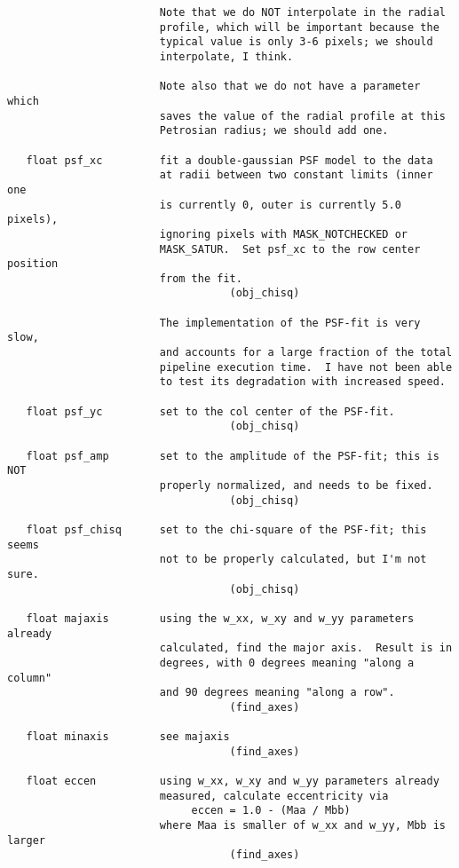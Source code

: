 \begin{verbatim}
                        Note that we do NOT interpolate in the radial
                        profile, which will be important because the
                        typical value is only 3-6 pixels; we should
                        interpolate, I think.

                        Note also that we do not have a parameter which
                        saves the value of the radial profile at this
                        Petrosian radius; we should add one.

   float psf_xc         fit a double-gaussian PSF model to the data
                        at radii between two constant limits (inner one
                        is currently 0, outer is currently 5.0 pixels),
                        ignoring pixels with MASK_NOTCHECKED or 
                        MASK_SATUR.  Set psf_xc to the row center position
                        from the fit.
                                   (obj_chisq)
 
                        The implementation of the PSF-fit is very slow,
                        and accounts for a large fraction of the total
                        pipeline execution time.  I have not been able
                        to test its degradation with increased speed.

   float psf_yc         set to the col center of the PSF-fit.
                                   (obj_chisq)

   float psf_amp        set to the amplitude of the PSF-fit; this is NOT
                        properly normalized, and needs to be fixed.
                                   (obj_chisq)

   float psf_chisq      set to the chi-square of the PSF-fit; this seems
                        not to be properly calculated, but I'm not sure.
                                   (obj_chisq)
    
   float majaxis        using the w_xx, w_xy and w_yy parameters already
                        calculated, find the major axis.  Result is in
                        degrees, with 0 degrees meaning "along a column"
                        and 90 degrees meaning "along a row".
                                   (find_axes)

   float minaxis        see majaxis
                                   (find_axes)

   float eccen          using w_xx, w_xy and w_yy parameters already
                        measured, calculate eccentricity via
                             eccen = 1.0 - (Maa / Mbb)
                        where Maa is smaller of w_xx and w_yy, Mbb is larger
                                   (find_axes)


\end{verbatim}
